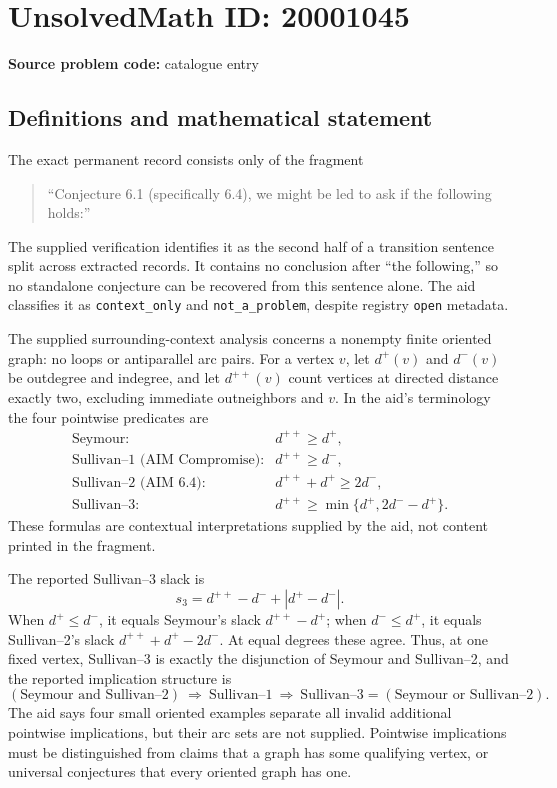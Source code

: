 \documentclass[11pt]{article}
\begin{document}
\section*{UnsolvedMath ID: 20001045}
\textbf{Source problem code:} catalogue entry
\subsection{Definitions and mathematical statement}
The exact permanent record consists only of the fragment
\begin{quote}
``Conjecture 6.1 (specifically 6.4), we might be led to ask if the following holds:''
\end{quote}
The supplied verification identifies it as the second half of a transition sentence split across extracted records. It contains no conclusion after ``the following,'' so no standalone conjecture can be recovered from this sentence alone. The aid classifies it as \texttt{context\_only} and \texttt{not\_a\_problem}, despite registry \texttt{open} metadata.

The supplied surrounding-context analysis concerns a nonempty finite oriented graph: no loops or antiparallel arc pairs. For a vertex \(v\), let \(d^+(v)\) and \(d^-(v)\) be outdegree and indegree, and let \(d^{++}(v)\) count vertices at directed distance exactly two, excluding immediate outneighbors and \(v\). In the aid's terminology the four pointwise predicates are
\[
 \begin{array}{ll}
 \text{Seymour:}&d^{++}\ge d^+,\\
 \text{Sullivan--1 (AIM Compromise):}&d^{++}\ge d^-,\\
 \text{Sullivan--2 (AIM 6.4):}&d^{++}+d^+\ge2d^-,\\
 \text{Sullivan--3:}&d^{++}\ge\min\{d^+,2d^- -d^+\}.
 \end{array}
\]
These formulas are contextual interpretations supplied by the aid, not content printed in the fragment.

The reported Sullivan--3 slack is
\[
 s_3=d^{++}-d^-+|d^+-d^-|.
\]
When \(d^+\le d^-\), it equals Seymour's slack \(d^{++}-d^+\); when \(d^-\le d^+\), it equals Sullivan--2's slack \(d^{++}+d^+-2d^-\). At equal degrees these agree. Thus, at one fixed vertex, Sullivan--3 is exactly the disjunction of Seymour and Sullivan--2, and the reported implication structure is
\[
 (\text{Seymour and Sullivan--2})
 \ \Longrightarrow\ \text{Sullivan--1}
 \ \Longrightarrow\ \text{Sullivan--3}
 = (\text{Seymour or Sullivan--2}).
\]
The aid says four small oriented examples separate all invalid additional pointwise implications, but their arc sets are not supplied. Pointwise implications must be distinguished from claims that a graph has some qualifying vertex, or universal conjectures that every oriented graph has one.
\end{document}
